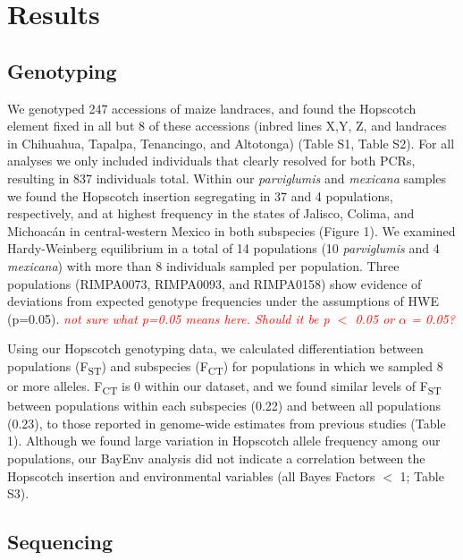 \documentclass[12pt]{article}
\newcommand{\mbh}[1]{\textcolor{red}{ \emph{\scriptsize  #1}} }
\begin{document}
\section*{Results}

\subsection*{Genotyping}

We genotyped 247 accessions of maize landraces, and found the Hopscotch element fixed in all but 8 of these accessions (inbred lines X,Y, Z, and landraces in Chihuahua, Tapalpa, Tenancingo, and Altotonga) (Table S1, Table S2). For all analyses we only included individuals that clearly resolved for both PCRs, resulting in 837 individuals total. Within our \emph{parviglumis} and \emph{mexicana} samples we found the Hopscotch insertion segregating in 37 and 4 populations, respectively, and at highest frequency in the states of Jalisco, Colima, and Michoac\'{a}n in central-western Mexico in both subspecies (Figure 1). We examined Hardy-Weinberg equilibrium in a total of 14 populations (10 \emph{parviglumis} and 4 \emph{mexicana}) with more than 8 individuals sampled per population. Three populations (RIMPA0073, RIMPA0093, and RIMPA0158) show evidence of deviations from expected genotype frequencies under the assumptions of HWE (p=0.05). \mbh{not sure what p=0.05 means here.  Should it be p $<$ 0.05 or $\alpha$ = 0.05?} 

Using our Hopscotch genotyping data, we calculated differentiation between populations (F\textsubscript{ST}) and subspecies (F\textsubscript{CT}) for populations in which we sampled 8 or more alleles. F\textsubscript{CT} is 0 within our dataset, and we found similar levels of F\textsubscript{ST} between populations within each subspecies (0.22) and between all populations (0.23), to those reported in genome-wide estimates from previous studies \cite{Pyhajarvi et al 2013} (Table 1). Although we found large variation in Hopscotch allele frequency among our populations, our BayEnv analysis did not indicate a correlation between the Hopscotch insertion and environmental variables (all Bayes Factors $<$ 1; Table S3). 

\subsection*{Sequencing}
\end{document}

